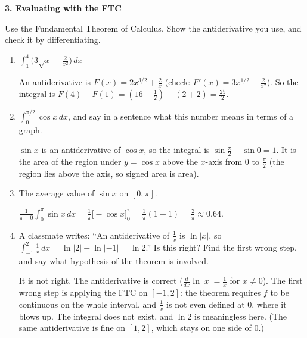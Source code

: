 \documentclass[11pt]{article}
\newcommand{\prob}[2]{\medskip\noindent\textbf{\large #1}\hfill\textit{#2}\par\smallskip}
\newenvironment{statement}{\par\color{gray!55!black}}{\par\medskip}
\begin{document}
\newpage
\prob{3. Evaluating with the FTC}{}
\begin{statement}
Use the Fundamental Theorem of Calculus. Show the antiderivative you use, and check it
by differentiating.
\end{statement}
\begin{enumerate}
\item {\color{gray!55!black}$\displaystyle\int_1^4\Big(3\sqrt x-\frac2{x^2}\Big)\,dx$}

\smallskip
An antiderivative is $F(x)=2x^{3/2}+\frac2x$ (check: $F'(x)=3x^{1/2}-\frac2{x^2}$).
So the integral is $F(4)-F(1)=(16+\tfrac12)-(2+2)=\tfrac{25}2$.
\item {\color{gray!55!black}$\displaystyle\int_0^{\pi/2}\cos x\,dx$, and say in a sentence what this number means
in terms of a graph.}

\smallskip
$\sin x$ is an antiderivative of $\cos x$, so the integral is $\sin\frac\pi2-\sin0=1$.
It is the area of the region under $y=\cos x$ above the $x$-axis from $0$ to $\frac\pi2$
(the region lies above the axis, so signed area is area).
\item {\color{gray!55!black}The average value of $\sin x$ on $[0,\pi]$.}

\smallskip
$\frac1{\pi-0}\int_0^\pi\sin x\,dx=\frac1\pi\big[-\cos x\big]_0^\pi=\frac1\pi(1+1)
=\frac2\pi\approx0.64$.
\item {\color{gray!55!black}A classmate writes: ``An antiderivative of $\frac1x$ is $\ln|x|$, so
$\int_{-1}^{2}\frac1x\,dx=\ln|2|-\ln|-1|=\ln2$.'' Is this right? Find the first wrong
step, and say what hypothesis of the theorem is involved.}

\smallskip
It is not right. The antiderivative is correct ($\frac d{dx}\ln|x|=\frac1x$ for
$x\neq0$). The first wrong step is applying the FTC on $[-1,2]$: the theorem requires $f$
to be continuous on the whole interval, and $\frac1x$ is not even defined at $0$, where it
blows up. The integral does not exist, and $\ln2$ is meaningless here. (The same
antiderivative is fine on $[1,2]$, which stays on one side of $0$.)
\end{enumerate}
\end{document}
